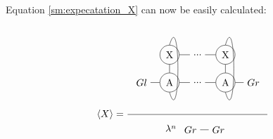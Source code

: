 Equation \cref{sm:expecatation_X} can now be easily calculated:

\begin{equation}
    \Braket{X} = \frac{
        \begin{tikzpicture} [   ]
            \clip (-0.5,-1) rectangle (4.5,2);

            \node[] (N1) at (0,0) {$Gl$};
            \node[circle, draw] (N2) at (1,0) {A};
            \node[circle, draw] (X2) at (1,1) {X};

            \node[] (N3) at (2 ,0) {...};
            \node[] (X3) at (2,1) {...};

            \node[circle, draw] (N4) at (3 ,0) {A};
            \node[circle, draw] (X4) at (3,1) {X};

            \node[] (N5) at (4 ,0) {$Gr$};

            \draw  (N1) -- (N2) ;
            \draw  (N2) -- (N3) ;
            \draw  (N3) -- (N4) ;
            \draw  (N4) -- (N5) ;

            \draw  (X2) -- (X3) ;
            \draw  (X3) -- (X4) ;

            \draw  (N2) -- (X2) ;
            \draw  (N4) -- (X4) ;

            \draw (X2.north)   .. controls +(0.4,1.4) and +(0.4,-1.4) .. (N2.south);
            \draw (X4.north)   .. controls +(0.4,1.4) and +(0.4,-1.4) .. (N4.south);

        \end{tikzpicture}
    }{
        \lambda^n
        \begin{tikzpicture}[baseline={0cm-0.5*height("$=$")} ]
            \clip (-0.5,-0.5) rectangle (1.4,0.5);
            \node[] (N2) at (1,0) {$Gr$};
            \node[] (N1) at (0,0) {$Gr$};
            \draw  (N1) -- (N2) ;
        \end{tikzpicture}
    }
    \label{sm:expecatation_X_2}
\end{equation}

